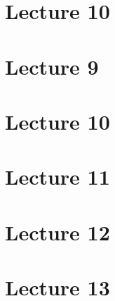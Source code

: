 \section*{Lecture 10}
\section*{Lecture 9}
\section*{Lecture 10}
\section*{Lecture 11}
\section*{Lecture 12}
\section*{Lecture 13}

